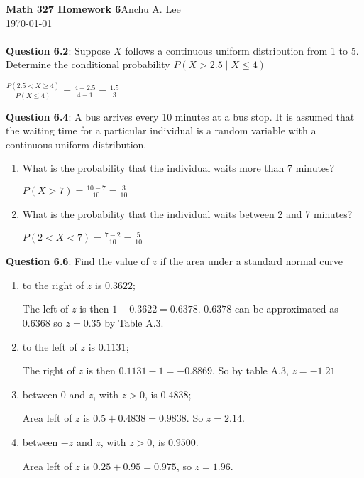 \documentclass{article}
\begin{document}
    \noindent\textbf{Math 327 Homework 6}\hfill Anchu A. Lee\\
    \noindent\today\\\\
    \noindent\textbf{Question 6.2}: Suppose $X$ follows a continuous uniform distribution 
    from 1 to 5. Determine the conditional probability $P(X>2.5\mid X\leq 4)$
        \begin{center}
            $\frac{P(2.5<X\geq 4)}{P(X\leq 4)} = \frac{4-2.5}{4-1} = \frac{1.5}{3}$
        \end{center}
    \noindent\textbf{Question 6.4}: A bus arrives every 10 minutes at a bus stop. It is 
    assumed that the waiting time for a particular individual is a random 
    variable with a continuous uniform distribution.
        \begin{enumerate}[label = (\alph*) ]
            \item What is the probability that the individual waits 
            more than 7 minutes?
                \begin{center}
                    $P(X>7) = \frac{10-7}{10} = \frac{3}{10}$ 
                \end{center}
            \item  What is the probability that the individual waits
            between 2 and 7 minutes?
                \begin{center}
                    $P(2<X<7) = \frac{7-2}{10} = \frac{5}{10}$
                \end{center}
        \end{enumerate}

    \noindent\textbf{Question 6.6}: Find the value of $z$ if the area under a standard
    normal curve
        \begin{enumerate}[label = (\alph*) ]
            \item to the right of $z$ is $0.3622$;
                \begin{center}
                    The left of $z$ is then $1 - 0.3622 = 0.6378$. $0.6378$ can be approximated as $0.6368$
                    so $z = 0.35$ by Table A.3.
                \end{center}
            \item to the left of $z$ is $0.1131$;
                \begin{center}
                    The right of $z$ is then $0.1131 - 1 = -0.8869$. So by table A.3, $z = -1.21$
                \end{center}
            \item between $0$ and $z$, with $z > 0$, is $0.4838$;
                \begin{center}
                    Area left of $z$ is $0.5 + 0.4838 = 0.9838$. So $z = 2.14$.
                \end{center}
            \item between $−z$ and $z$, with $z > 0$, is $0.9500$.
                \begin{center}
                    Area left of $z$ is $0.25 + 0.95 = 0.975$, so $z = 1.96$.
                \end{center}
        \end{enumerate}
\end{document}
